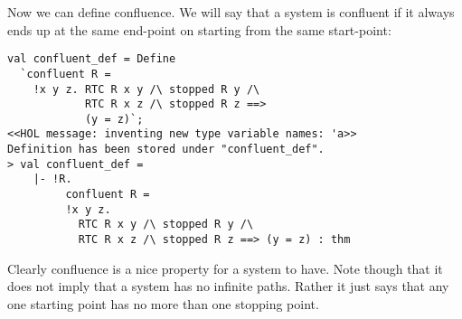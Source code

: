 \documentclass[12pt]{article}
\begin{document}
Now we can define confluence.  We will say that a system is confluent
if it always ends up at the same end-point on starting from the same
start-point:
\begin{session}\begin{verbatim}
val confluent_def = Define
  `confluent R =
    !x y z. RTC R x y /\ stopped R y /\
            RTC R x z /\ stopped R z ==>
            (y = z)`;
<<HOL message: inventing new type variable names: 'a>>
Definition has been stored under "confluent_def".
> val confluent_def =
    |- !R.
         confluent R =
         !x y z.
           RTC R x y /\ stopped R y /\
           RTC R x z /\ stopped R z ==> (y = z) : thm
\end{verbatim}\end{session}
    Clearly confluence is a nice property for a system to have.  Note
    though that it does not imply that a system has no infinite
    paths.  Rather it just says that any one starting point has no
    more than one stopping point.
\end{document}
